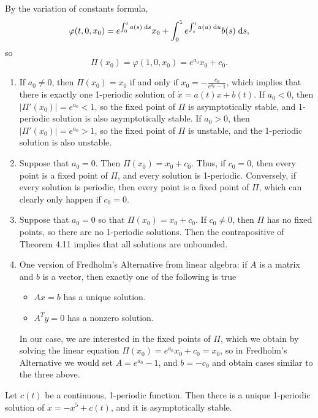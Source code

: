 \documentclass[nonumber]{homework}
\begin{document}
	By the variation of constants formula,
	\begin{equation*}
		\varphi(t,0,x_0) = e^{\int_0^ta(s)\;\text{d} s}x_0 + \int_0^1e^{\int_s^t a(u)\;\text{d} u}b(s)\;\text{d} s,
	\end{equation*}
	so
	\begin{equation*}
		\Pi(x_0) = \varphi(1,0,x_0) = e^{a_0}x_0 + c_0.
	\end{equation*}
	
	\begin{enumerate}
		\item If $a_0 \ne0$, then $\Pi(x_0) = x_0$ if and only if $x_0 = -\frac{c_0}{e^{a_0}-1}$, which implies that there is exactly one 1-periodic solution of $\dot{x} = a(t)x + b(t)$. If $a_0 < 0$, then $|\Pi'(x_0)| = e^{a_0} < 1$, so the fixed point of $\Pi$ is asymptotically stable, and 1-periodic solution is also asymptotically stable. If $a_0 > 0$, then $|\Pi'(x_0)| = e^{a_0} > 1$, so the fixed point of $\Pi$ is unstable, and the 1-periodic solution is also unstable.
		
		\item Suppose that $a_0 = 0$. Then $\Pi(x_0) = x_0 + c_0$. Thus, if $c_0 = 0$, then every point is a fixed point of $\Pi$, and every solution is 1-periodic. Conversely, if every solution is periodic, then every point is a fixed point of $\Pi$, which can clearly only happen if $c_0 = 0$.
		
		\item Suppose that $a_0 = 0$ so that $\Pi(x_0) = x_0 + c_0$. If $c_0 \ne 0$, then $\Pi$ has no fixed points, so there are no 1-periodic solutions. Then the contrapositive of Theorem 4.11 implies that all solutions are unbounded.
		
		\item One version of Fredholm's Alternative from linear algebra: if $A$ is a matrix and $b$ is a vector, then exactly one of the following is true
		\begin{itemize}
			\item $Ax = b$ has a unique solution.
			\item $A^Ty = 0$ has a nonzero solution.
		\end{itemize}
		In our case, we are interested in the fixed points of $\Pi$, which we obtain by solving the linear equation $\Pi(x_0) = e^{a_0}x_0 + c_0 = x_0$, so in Fredholm's Alternative we would set $A = e^{a_0} - 1$, and $b = -c_0$ and obtain cases similar to the three above.
	\end{enumerate}
	
	 Let $c(t)$ be a continuous, 1-periodic function. Then there is a unique 1-periodic solution of $\dot{x} = -x^5 + c(t)$, and it is asymptotically stable.
	
\end{document}
